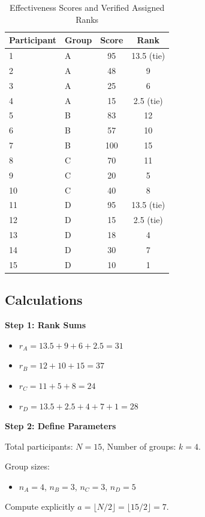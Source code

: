\documentclass[man,floatsintext]{apa7}
\begin{document}
\begin{table}[htbp!]
\centering
\caption{Effectiveness Scores and Verified Assigned Ranks}
\begin{tabular}{llcc}
\toprule
Participant & Group & Score & Rank \\
\midrule
1 & A & 95 & 13.5 (tie) \\
2 & A & 48 & 9 \\
3 & A & 25 & 6 \\
4 & A & 15 & 2.5 (tie) \\
5 & B & 83 & 12 \\
6 & B & 57 & 10 \\
7 & B & 100 & 15 \\
8 & C & 70 & 11 \\
9 & C & 20 & 5 \\
10 & C & 40 & 8 \\
11 & D & 95 & 13.5 (tie) \\
12 & D & 15 & 2.5 (tie) \\
13 & D & 18 & 4 \\
14 & D & 30 & 7 \\
15 & D & 10 & 1 \\
\bottomrule
\end{tabular}
\label{initial-data}
\end{table}

\subsection{Calculations}

\textbf{Step 1: Rank Sums}
\begin{itemize}
\item $r_A = 13.5 + 9 + 6 + 2.5 = 31$
\item $r_B = 12 + 10 + 15 = 37$
\item $r_C = 11 + 5 + 8 = 24$
\item $r_D = 13.5 + 2.5 + 4 + 7 + 1 = 28$
\end{itemize}

\textbf{Step 2: Define Parameters}

Total participants: $N=15$, Number of groups: $k=4$.

Group sizes:
\begin{itemize}
\item $n_A = 4$, $n_B = 3$, $n_C = 3$, $n_D = 5$
\end{itemize}

Compute explicitly $a = \lfloor N/2 \rfloor = \lfloor 15/2 \rfloor = 7$.
\end{document}
